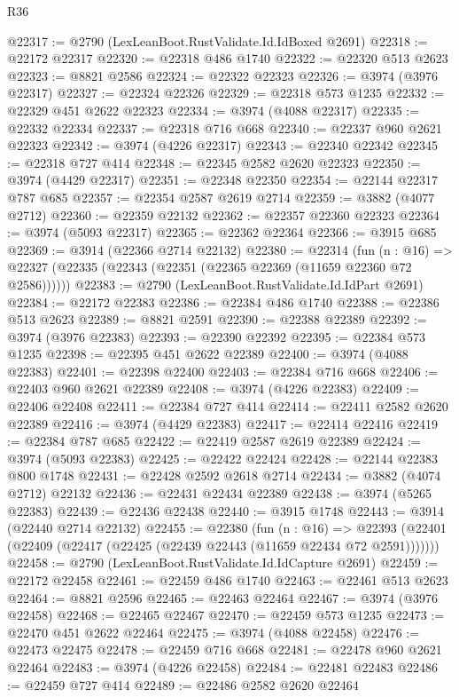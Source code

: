 \begin{lexlean}{R36}
\begin{coremodule}
@22317 := @2790 (LexLeanBoot.RustValidate.Id.IdBoxed @2691)
@22318 := @22172 @22317
@22320 := @22318 @486 @1740
@22322 := @22320 @513 @2623
@22323 := @8821 @2586
@22324 := @22322 @22323
@22326 := @3974 (@3976 @22317)
@22327 := @22324 @22326
@22329 := @22318 @573 @1235
@22332 := @22329 @451 @2622 @22323
@22334 := @3974 (@4088 @22317)
@22335 := @22332 @22334
@22337 := @22318 @716 @668
@22340 := @22337 @960 @2621 @22323
@22342 := @3974 (@4226 @22317)
@22343 := @22340 @22342
@22345 := @22318 @727 @414
@22348 := @22345 @2582 @2620 @22323
@22350 := @3974 (@4429 @22317)
@22351 := @22348 @22350
@22354 := @22144 @22317 @787 @685
@22357 := @22354 @2587 @2619 @2714
@22359 := @3882 (@4077 @2712)
@22360 := @22359 @22132
@22362 := @22357 @22360 @22323
@22364 := @3974 (@5093 @22317)
@22365 := @22362 @22364
@22366 := @3915 @685
@22369 := @3914 (@22366 @2714 @22132)
@22380 := @22314
    (fun (n : @16) => @22327 (@22335 (@22343 (@22351 (@22365 @22369 (@11659 @22360 @72 @2586))))))
@22383 := @2790 (LexLeanBoot.RustValidate.Id.IdPart @2691)
@22384 := @22172 @22383
@22386 := @22384 @486 @1740
@22388 := @22386 @513 @2623
@22389 := @8821 @2591
@22390 := @22388 @22389
@22392 := @3974 (@3976 @22383)
@22393 := @22390 @22392
@22395 := @22384 @573 @1235
@22398 := @22395 @451 @2622 @22389
@22400 := @3974 (@4088 @22383)
@22401 := @22398 @22400
@22403 := @22384 @716 @668
@22406 := @22403 @960 @2621 @22389
@22408 := @3974 (@4226 @22383)
@22409 := @22406 @22408
@22411 := @22384 @727 @414
@22414 := @22411 @2582 @2620 @22389
@22416 := @3974 (@4429 @22383)
@22417 := @22414 @22416
@22419 := @22384 @787 @685
@22422 := @22419 @2587 @2619 @22389
@22424 := @3974 (@5093 @22383)
@22425 := @22422 @22424
@22428 := @22144 @22383 @800 @1748
@22431 := @22428 @2592 @2618 @2714
@22434 := @3882 (@4074 @2712) @22132
@22436 := @22431 @22434 @22389
@22438 := @3974 (@5265 @22383)
@22439 := @22436 @22438
@22440 := @3915 @1748
@22443 := @3914 (@22440 @2714 @22132)
@22455 := @22380
    (fun (n : @16) =>
    @22393 (@22401 (@22409 (@22417 (@22425 (@22439 @22443 (@11659 @22434 @72 @2591)))))))
@22458 := @2790 (LexLeanBoot.RustValidate.Id.IdCapture @2691)
@22459 := @22172 @22458
@22461 := @22459 @486 @1740
@22463 := @22461 @513 @2623
@22464 := @8821 @2596
@22465 := @22463 @22464
@22467 := @3974 (@3976 @22458)
@22468 := @22465 @22467
@22470 := @22459 @573 @1235
@22473 := @22470 @451 @2622 @22464
@22475 := @3974 (@4088 @22458)
@22476 := @22473 @22475
@22478 := @22459 @716 @668
@22481 := @22478 @960 @2621 @22464
@22483 := @3974 (@4226 @22458)
@22484 := @22481 @22483
@22486 := @22459 @727 @414
@22489 := @22486 @2582 @2620 @22464

\end{coremodule}
\end{lexlean}
